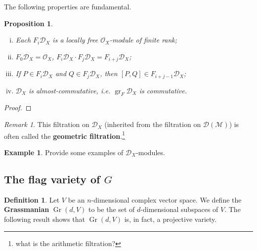 \documentclass{article}
\theoremstyle{plain}
\newtheorem{proposition}[theorem]{Proposition}
\theoremstyle{definition}
\newtheorem{definition}[theorem]{Definition}
\newtheorem{example}[theorem]{Example}
\theoremstyle{remark}
\newtheorem*{remark}{Remark}
\DeclareMathOperator{\Gr}{Gr}
\DeclareMathOperator{\gr}{gr}
\begin{document}
The following properties are fundamental.

\begin{proposition}\hspace{1mm}
    \begin{enumerate}[(i)]
        \item Each $F_i\mathcal{D}_X$ is a locally free $\mathcal{O}_X$-module of finite rank;
        \item $F_0\mathcal{D}_X=\mathcal{O}_X$, $F_i\mathcal{D}_X\cdot F_j\mathcal{D}_X=F_{i+j}\mathcal{D}_X$;
        \item If $P\in F_i\mathcal{D}_X$ and $Q\in F_j\mathcal{D}_X$, then $[P,Q]\in F_{i+j-1}\mathcal{D}_X$;
        \item $\mathcal{D}_X$ is almost-commutative, i.e. $\gr_F\mathcal{D}_X$ is commutative.
    \end{enumerate}
\end{proposition}
\begin{proof}
    
\end{proof}

\begin{remark}
    This filtration on $\mathcal{D}_X$ (inherited from the filtration on $\mathcal{D}(\mathcal{M})$)
    is often called the \textbf{geometric filtration}.\footnote{what is the arithmetic filtration?}
\end{remark}

\begin{example}
    Provide some examples of $\mathcal{D}_X$-modules.
\end{example}


\subsection{The flag variety of $G$}

\begin{definition}
    Let $V$ be an $n$-dimensional complex vector space. We define the \textbf{Grassmanian} $\Gr(d,V)$
    to be the set of $d$-dimensional subspaces of $V$. The following result shows that $\Gr(d,V)$ is,
    in fact, a projective variety.
\end{definition}
\end{document}

